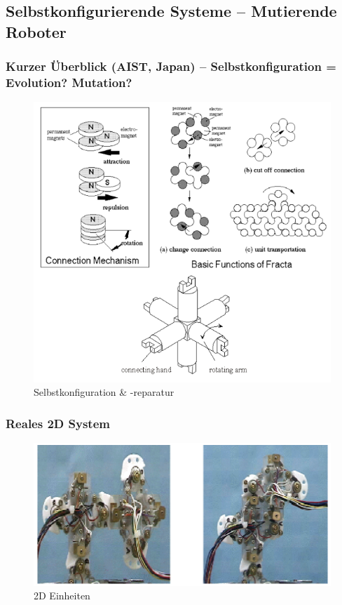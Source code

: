 \subsection{Selbstkonfigurierende Systeme -- Mutierende Roboter}
\subsubsection{Kurzer Überblick (AIST, Japan) -- Selbstkonfiguration = Evolution? Mutation?}
\begin{figure}[H]
	\centering
	\includegraphics[width=.4\textwidth]{figures/ch11_selbstkonf.png}
	\caption{Selbstkonfiguration \& -reparatur}
	\label{selbstkonf}
\end{figure}
\subsubsection{Reales 2D System}
\begin{figure}[!htb]
	\centering
	\includegraphics[width=.45\textwidth]{figures/ch11_2d.png}
	\caption{2D Einheiten}
	\label{2d}
\end{figure}
